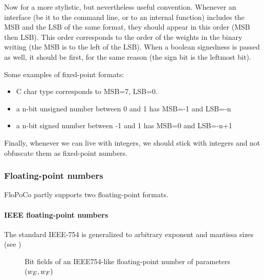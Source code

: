\documentclass{article}
\begin{document}
Now for a more stylistic, but nevertheless useful convention.
Whenever an interface (be it to the command line, or to an internal function) includes the MSB and the LSB of the same format, they should appear in this order (MSB then LSB).
This order corresponds to the order of the weights in the binary writing (the MSB is to the left of the LSB). 
When a boolean signedness is passed as well, it should be first, for the same reason (the sign bit is the leftmost bit).

Some examples of fixed-point formats:
\begin{itemize}
\item C char type corresponds to MSB=7, LSB=0.
\item a n-bit unsigned number between 0 and 1 has MSB=-1 and LSB=-n
\item a n-bit signed number between -1 and 1 has MSB=0 and LSB=-n+1
\end{itemize}

Finally, whenever we can live with integers, we should stick with integers and not obfuscate them as fixed-point numbers.



 

\subsubsection{Floating-point numbers}

FloPoCo partly supports two floating-point formats.

\paragraph{IEEE floating-point numbers}
The standard IEEE-754 is generalized to arbitrary exponent and mantissa sizes (see )
 \begin{figure}[h]
   \centering
    \caption{Bit fields of an IEEE754-like  floating-point number of parameters $({w_E},{w_F})$}
   \label{fig:ieee-fp-format}
 \end{figure}
\end{document}
